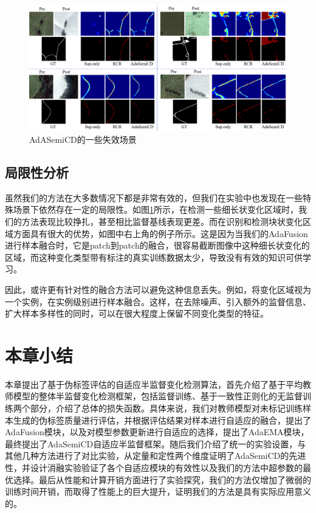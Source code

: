 \documentclass[lang=chs, degree=master, blindreview=false, adobe=false]{yanputhesis}
\begin{document}
\begin{figure}[!htbp]
  \centering
  \includegraphics[scale=0.4]{images/AdAerrorVis.png}
  \caption{
    AdASemiCD的一些失效场景
  }
  \label{fig:AdaError}
\end{figure}

\subsection{局限性分析}
虽然我们的方法在大多数情况下都是非常有效的，但我们在实验中也发现在一些特殊场景下依然存在一定的局限性。如图\ref{fig:AdaError}所示，在检测一些细长状变化区域时，我们的方法表现比较挣扎，甚至相比监督基线表现更差。而在识别和检测块状变化区域方面具有很大的优势，如图中右上角的例子所示。这是因为当我们的AdaFusion进行样本融合时，它是patch到patch的融合，很容易截断图像中这种细长状变化的区域，而这种变化类型带有标注的真实训练数据太少，导致没有有效的知识可供学习。

因此，或许更有针对性的融合方法可以避免这种信息丢失。例如，将变化区域视为一个实例，在实例级别进行样本融合。这样，在去除噪声、引入额外的监督信息、扩大样本多样性的同时，可以在很大程度上保留不同变化类型的特征。
\section{本章小结}
本章提出了基于伪标签评估的自适应半监督变化检测算法，首先介绍了基于平均教师模型的整体半监督变化检测框架，包括监督训练、基于一致性正则化的无监督训练两个部分，介绍了总体的损失函数。具体来说，我们对教师模型对未标记训练样本生成的伪标签质量进行评估，并根据评估结果对样本进行自适应的融合，提出了AdaFusion模块，以及对模型参数更新进行自适应的选择，提出了AdaEMA模块，最终提出了AdaSemiCD自适应半监督框架。随后我们介绍了统一的实验设置，与其他几种方法进行了对比实验，从定量和定性两个维度证明了AdaSemiCD的先进性，并设计消融实验验证了各个自适应模块的有效性以及我们的方法中超参数的最优选择。最后从性能和计算开销方面进行了实验探究，我们的方法仅增加了微弱的训练时间开销，而取得了性能上的巨大提升，证明我们的方法是具有实际应用意义的。
\end{document}
